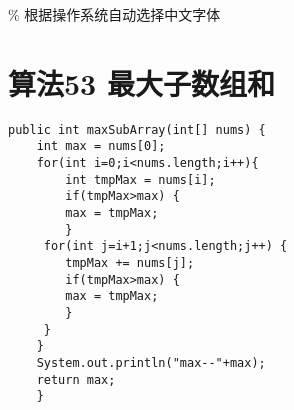 \documentclass[11pt]{article}
\author{myu}
\date{\today}
\title{}
\begin{document}
\tableofcontents

\% 根据操作系统自动选择中文字体

\section{算法53 最大子数组和}
\label{sec:org37bf6c5}
\begin{verbatim}
public int maxSubArray(int[] nums) {
	int max = nums[0];
	for(int i=0;i<nums.length;i++){
	    int tmpMax = nums[i];
	    if(tmpMax>max) {
		max = tmpMax;
	    }
	 for(int j=i+1;j<nums.length;j++) {
	    tmpMax += nums[j];
	    if(tmpMax>max) {
		max = tmpMax;
	    }
	 }
	}
	System.out.println("max--"+max);
	return max;
    }
\end{verbatim}
\end{document}
